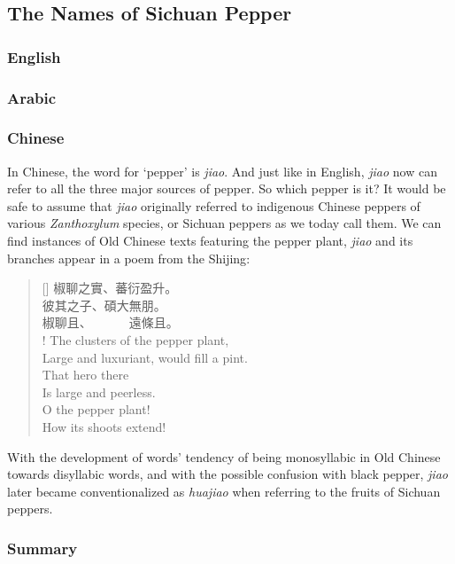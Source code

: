 \subsection{The Names of Sichuan Pepper}

\subsubsection{English}



\subsubsection{Arabic}



\subsubsection{Chinese}


In Chinese, the word for `pepper' is \textit{jiao}. And just like in English, \textit{jiao} now can refer to all the three major sources of pepper. So which pepper is it? It would be safe to assume that \textit{jiao} originally referred to indigenous Chinese peppers of various \textit{Zanthoxylum} species, or Sichuan peppers as we today call them. We can find instances of Old Chinese texts featuring the pepper plant, \textit{jiao} and its branches appear in a poem from the \gls{Shijing}:

\settowidth{\versewidth}{The clusters of the pepper plant,}
\begin{verse}[\versewidth]
椒聊之實、蕃衍盈升。\\
彼其之子、碩大無朋。\\
椒聊且、~~~~~~遠條且。\\!
The clusters of the pepper plant,\\
Large and luxuriant, would fill a pint.\\
That hero there\\
Is large and peerless.\\
O the pepper plant!\\
How its shoots extend!\\
\end{verse}

With the development of words' tendency of being monosyllabic in Old Chinese towards disyllabic words, and with the possible confusion with black pepper, \textit{jiao} later became conventionalized as \textit{huajiao} when referring to the fruits of Sichuan peppers. 



\subsubsection{Summary}












